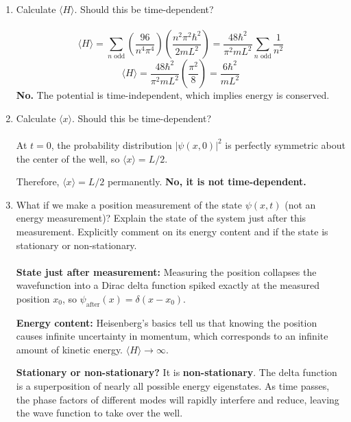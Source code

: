 \documentclass{article}
\begin{document}
\begin{enumerate}[label=\alph*.]
\begin{enumerate}[label=\roman*.]
        \item What is the state at a later time $t + \Delta t$?
        \\
        \[ \psi_{\text{later}}(x, t+\Delta t) = \phi_3(x) e^{-iE_3 \Delta t/\hbar} = \sqrt{\frac{2}{L}} \sin\left(\frac{3\pi x}{L}\right) e^{-iE_3 \Delta t/\hbar} \]
    \end{enumerate}

    \item Calculate $\langle H \rangle$. Should this be time-dependent?
    \\
    \\
    \[ \langle H \rangle = \sum_{n \text{ odd}} \left( \frac{96}{n^4\pi^4} \right) \left( \frac{n^2\pi^2\hbar^2}{2mL^2} \right) = \frac{48\hbar^2}{\pi^2 mL^2} \sum_{n \text{ odd}} \frac{1}{n^2} \]
    \[ \langle H \rangle = \frac{48\hbar^2}{\pi^2 mL^2} \left( \frac{\pi^2}{8} \right) = \frac{6\hbar^2}{mL^2} \]
    \textbf{No.} The potential is time-independent, which implies energy is conserved. 

    \item Calculate $\langle x \rangle$. Should this be time-dependent?
    \\
    \\
    At $t=0$, the probability distribution $|\psi(x,0)|^2$ is perfectly symmetric about the center of the well, so $\langle x \rangle = L/2$. 
        
    Therefore, $\langle x \rangle = L/2$ permanently. \textbf{No, it is not time-dependent.}

    \item What if we make a position measurement of the state $\psi(x, t)$ (not an energy measurement)? Explain the state of the system just after this measurement. Explicitly comment on its energy content and if the state is stationary or non-stationary.
    \\
    \\
    \textbf{State just after measurement:} Measuring the position collapses the wavefunction into a Dirac delta function spiked exactly at the measured position $x_0$, so $\psi_{\text{after}}(x) = \delta(x - x_0)$.
    
    \textbf{Energy content:} Heisenberg's basics tell us that knowing the position causes infinite uncertainty in momentum, which corresponds to an infinite amount of kinetic energy. $\langle H \rangle \to \infty$. 
    
    \textbf{Stationary or non-stationary?} It is \textbf{non-stationary}. The delta function is a superposition of nearly all possible energy eigenstates. As time passes, the  phase factors of different modes will rapidly interfere and reduce, leaving the wave function to take over the well.

\end{enumerate}
\end{document}
